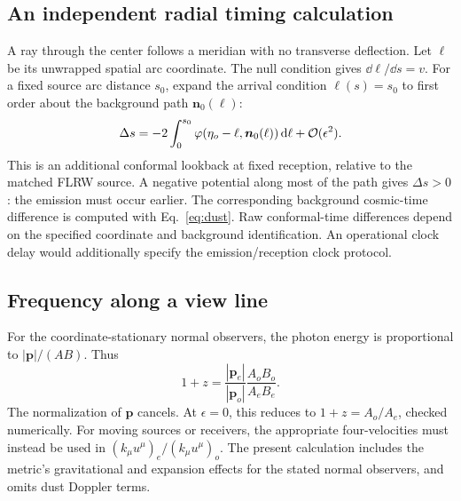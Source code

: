 \subsection{An independent radial timing calculation}
A ray through the center follows a meridian with no transverse deflection.
Let $\ell$ be its unwrapped spatial arc coordinate. The null condition
gives $\dd\ell/\dd s=v$. For a fixed source arc distance $s_0$, expand
the arrival condition $\ell(s)=s_0$ to first order about the background
path $\bm n_0(\ell)$:
\begin{equation}\label{eq:born-delay}
 \Delta s=-2\int_0^{s_0}
 \varphi(\eta_o-\ell,\bm n_0(\ell))\,\mathrm{d}\ell+\mathcal O(\epsilon^2).
\end{equation}
This is an additional conformal lookback at fixed reception, relative to
the matched FLRW source. A negative potential along most of the path
gives $\Delta s>0$: the emission must occur earlier. The corresponding
background cosmic-time difference is computed with Eq.~\eqref{eq:dust}.
Raw conformal-time differences depend on the specified coordinate and
background identification. An operational clock delay would additionally
specify the emission/reception clock protocol.

\subsection{Frequency along a view line}
For the coordinate-stationary normal observers, the photon energy is
proportional to $|\bm p|/(AB)$. Thus
\begin{equation}\label{eq:redshift}
 1+z=\frac{|\bm p_e|}{|\bm p_o|}\frac{A_oB_o}{A_eB_e}.
\end{equation}
The normalization of $\bm p$ cancels. At $\epsilon=0$, this reduces to
$1+z=A_o/A_e$, checked numerically. For moving sources or receivers,
the appropriate four-velocities must instead be used in
$(k_\mu u^\mu)_e/(k_\mu u^\mu)_o$. The present calculation includes
the metric's gravitational and expansion effects for the stated normal
observers, and omits dust Doppler terms.

